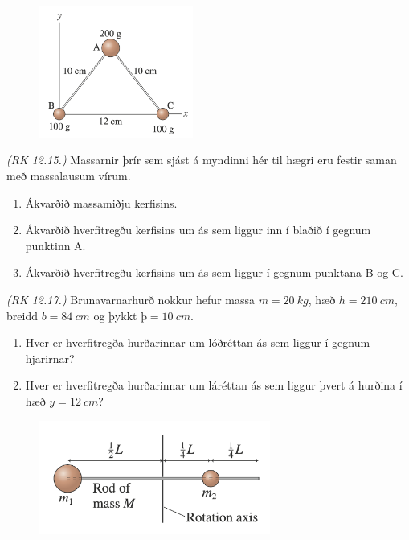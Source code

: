 \begin{enumerate}[label = \textbf{Dæmi \thechapter.\arabic*.}]
\begin{minipage}{\linewidth}

\begin{figure}
\vspace{-1cm}
\includegraphics[width=2in]{images/inertiarot2.png}
\end{figure}

\item \textit{(RK 12.15.)} Massarnir þrír sem sjást á myndinni hér til hægri eru festir saman með massalausum vírum.

\begin{enumerate}[label = \textbf{(\alph*)}]
    \item Ákvarðið massamiðju kerfisins.
    \item Ákvarðið hverfitregðu kerfisins um ás sem liggur inn í blaðið í gegnum punktinn A.
    \item Ákvarðið hverfitregðu kerfisins um ás sem liggur í gegnum punktana B og C.
\end{enumerate}

\end{minipage}

\item \textit{(RK 12.17.)} Brunavarnarhurð nokkur hefur massa $m = \SI{20}{kg}$, hæð $h = \SI{210}{cm}$, breidd $b = \SI{84}{cm}$ og þykkt $þ = \SI{10}{cm}$.
\begin{enumerate}[label = \textbf{(\alph*)}]
    \item Hver er hverfitregða hurðarinnar um lóðréttan ás sem liggur í gegnum hjarirnar?
    \item Hver er hverfitregða hurðarinnar um láréttan ás sem liggur þvert á hurðina í hæð $y = \SI{12}{cm}$?
\end{enumerate}


\begin{minipage}{\linewidth}

\begin{figure}
\vspace{-0.75cm}
\includegraphics[width=3in]{images/gone.png}
\end{figure}


\end{minipage}
\end{enumerate}

